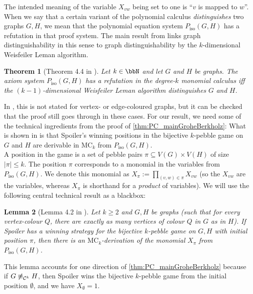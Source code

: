 \documentclass[10pt,a4paper]{article}
\newtheorem{theorem}{Theorem}
\newtheorem{lemma}[theorem]{Lemma}
\newcommand{\MC}{\textrm{MC}}
\newcommand{\Cc}{{\cal C}}
\newcommand{\Piso}{P_{\text{iso}}}
\begin{document}
	The intended meaning of the variable $X_{vw}$ being set to one is ``$v$ is mapped to $w$''. 
	When we say that a certain variant of the polynomial calculus \emph{distinguishes} two graphs $G,H$, we mean that the polynomial equation system $\Piso(G,H)$ has a refutation in that proof system.
	The main result from \cite{berkholz} links graph distinguishability in this sense to graph distinguishability by the $k$-dimensional Weisfeiler Leman algorithm. 
	\begin{theorem}[Theorem 4.4 in \cite{berkholz}]
		\label{thm:PC_mainGroheBerkholz}
		Let $k \in \bbN$ and let $G$ and $H$ be graphs.
		The axiom system $\Piso(G,H)$ has a refutation in the degree-$k$ monomial calculus iff the $(k-1)$-dimensional Weisfeiler Leman algorithm distinguishes $G$ and $H$.
	\end{theorem}
	In \cite{berkholz}, this is not stated for vertex- or edge-coloured graphs, but it can be checked that the proof still goes through in these cases.
	For our result, we need some of the technical ingredients from the proof of \autoref{thm:PC_mainGroheBerkholz}: What is shown in \cite{berkholz} is that Spoiler's winning positions in the bijective $k$-pebble game on $G$ and $H$ are derivable in $\MC_k$ from $\Piso(G,H)$.\\
	A position in the game is a set of pebble pairs $\pi \subseteq V(G) \times V(H)$ of size $|\pi| \leq k$. The position $\pi$ corresponds to a monomial in the variables from $\Piso(G,H)$. We denote this monomial as $X_\pi := \prod_{(v,w) \in \pi} X_{vw}$ (so the $X_{vw}$ are the variables, whereas $X_\pi$ is shorthand for a \emph{product} of variables). We will use the following central technical result as a blackbox:
	\begin{lemma}[Lemma 4.2 in \cite{berkholz}]
		\label{lem:PC_groheberkholzlemma}
		Let $k \geq 2$ and $G,H$ be graphs (such that for every vertex-colour $Q$, there are exactly as many vertices of colour $Q$ in $G$ as in $H$). If Spoiler has a winning strategy for the bijective $k$-pebble game on $G,H$ with initial position $\pi$, then there is an $\MC_k$-derivation of the monomial $X_{\pi}$ from $\Piso(G,H)$.
	\end{lemma}
	This lemma accounts for one direction of \autoref{thm:PC_mainGroheBerkholz} because if $G \not\equiv_{\Cc^{k}} H$, then Spoiler wins the bijective $k$-pebble game from the initial position $\emptyset$, and we have $X_\emptyset = 1$. 
	
	
	
\end{document}
